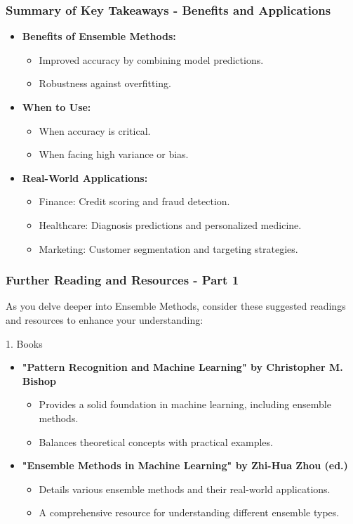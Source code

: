\documentclass[aspectratio=169]{beamer}
\begin{document}
\begin{frame}[fragile]
    \frametitle{Summary of Key Takeaways - Benefits and Applications}
    \begin{itemize}
        \item \textbf{Benefits of Ensemble Methods:}
            \begin{itemize}
                \item Improved accuracy by combining model predictions.
                \item Robustness against overfitting.
            \end{itemize}
        \item \textbf{When to Use:}
            \begin{itemize}
                \item When accuracy is critical.
                \item When facing high variance or bias.
            \end{itemize}
        \item \textbf{Real-World Applications:}
            \begin{itemize}
                \item Finance: Credit scoring and fraud detection.
                \item Healthcare: Diagnosis predictions and personalized medicine.
                \item Marketing: Customer segmentation and targeting strategies.
            \end{itemize}
    \end{itemize}
\end{frame}

\begin{frame}[fragile]
  \frametitle{Further Reading and Resources - Part 1}
  As you delve deeper into Ensemble Methods, consider these suggested readings and resources to enhance your understanding:
  
  \begin{block}{1. Books}
    \begin{itemize}
      \item \textbf{"Pattern Recognition and Machine Learning" by Christopher M. Bishop}
        \begin{itemize}
          \item Provides a solid foundation in machine learning, including ensemble methods. 
          \item Balances theoretical concepts with practical examples.
        \end{itemize}
      \item \textbf{"Ensemble Methods in Machine Learning" by Zhi-Hua Zhou (ed.)}
        \begin{itemize}
          \item Details various ensemble methods and their real-world applications.
          \item A comprehensive resource for understanding different ensemble types.
        \end{itemize}
    \end{itemize}
  \end{block}
\end{frame}
\end{document}

